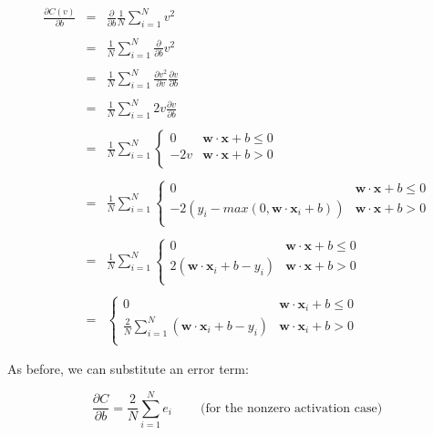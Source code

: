 \documentclass[11pt]{article}
\begin{document}
\allowdisplaybreaks
\begin{eqnarray*}
\frac{\partial C(v)}{\partial b} & = & \frac{\partial }{\partial b}\frac{1}{N} \sum_{i=1}^N v^2\\\\
 & = & \frac{1}{N} \sum_{i=1}^N \frac{\partial}{\partial b} v^2\\\\
 & = & \frac{1}{N} \sum_{i=1}^N \frac{\partial v^2}{\partial v} \frac{\partial v}{\partial b} \\\\
 & = & \frac{1}{N} \sum_{i=1}^N 2v \frac{\partial v}{\partial b} \\\\
 & = & \frac{1}{N} \sum_{i=1}^N \begin{cases}
 	0 & \mathbf{w} \cdot \mathbf{x} + b \leq 0\\
 	-2v & \mathbf{w} \cdot \mathbf{x} + b > 0\\
 \end{cases}\\\\
 & = & \frac{1}{N} \sum_{i=1}^N \begin{cases}
 	0 & \mathbf{w} \cdot \mathbf{x} + b \leq 0\\
 	-2(y_i-max(0, \mathbf{w}\cdot\mathbf{x}_i+b)) & \mathbf{w} \cdot \mathbf{x} + b > 0\\
 \end{cases}\\\\
 & = & \frac{1}{N} \sum_{i=1}^N \begin{cases}
 	0 & \mathbf{w} \cdot \mathbf{x} + b \leq 0\\
 	2(\mathbf{w}\cdot\mathbf{x}_i+b-y_i) & \mathbf{w} \cdot \mathbf{x} + b > 0\\
 \end{cases}\\\\
 & = & \begin{cases}
	0 & \mathbf{w} \cdot \mathbf{x}_i + b \leq 0\\
	\frac{2}{N} \sum_{i=1}^N (\mathbf{w}\cdot\mathbf{x}_i+b-y_i) & \mathbf{w} \cdot \mathbf{x}_i + b > 0\\
\end{cases}
\end{eqnarray*}

As before, we can substitute an error term:

\[
\frac{\partial C}{\partial b} = \frac{2}{N} \sum_{i=1}^N e_i ~~~~~~~~~~\text{(for the nonzero activation case)}
\]
\end{document}
